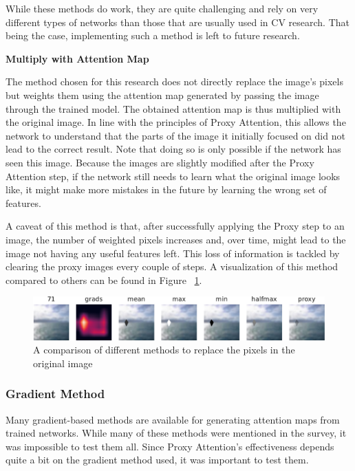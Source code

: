 \documentclass[a4paper,11pt,openright]{book}
\begin{document}
While these methods do work, they are quite challenging and rely on very different types of networks than those that are usually used in CV research. That being the case, implementing such a method is left to future research.

\textbf{Multiply with Attention Map}

The method chosen for this research does not directly replace the image's pixels but weights them using the attention map generated by passing the image through the trained model.
The obtained attention map is thus multiplied with the original image. In line with the principles of Proxy Attention, this allows the network to understand that the parts of the image it initially focused on did not lead to the correct result. Note that doing so is only possible if the network has seen this image. Because the images are slightly modified after the Proxy Attention step, if the network still needs to learn what the original image looks like, it might make more mistakes in the future by learning the wrong set of features.

A caveat of this method is that, after successfully applying the Proxy step to an image, the number of weighted pixels increases and, over time, might lead to the image not having any useful features left. This loss of information is tackled by clearing the proxy images every couple of steps.
A visualization of this method compared to others can be found in Figure ~\ref{fig:methods}.

\begin{figure}[h]
    \centering
    \includegraphics[width=1\textwidth]{images/methods-crop.pdf}
    \caption{A comparison of different methods to replace the pixels in the original image}
    \label{fig:methods}
\end{figure}

\subsubsection{Gradient Method}
Many gradient-based methods are available for generating attention maps from trained networks. While many of these methods were mentioned in the survey, it was impossible to test them all. Since Proxy Attention's effectiveness depends quite a bit on the gradient method used, it was important to test them.
\end{document}
